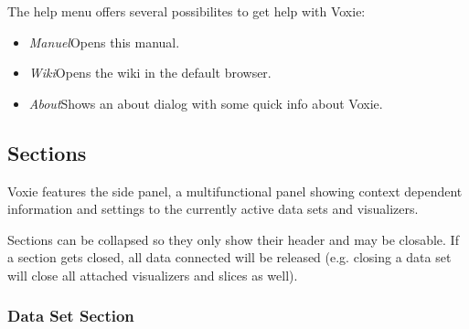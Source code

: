 The help menu offers several possibilites to get help with Voxie:

\begin{itemize}
	\item{\emph{Manuel}\newline Opens this manual.}
	\item{\emph{Wiki}\newline Opens the wiki in the default browser.}
	\item{\emph{About}\newline Shows an about dialog with some quick info about Voxie.}
\end{itemize}

\subsection{Sections}
\label{sections}

Voxie features the side panel, a multifunctional panel showing context dependent
information and settings to the currently active data sets and visualizers.

Sections can be collapsed so they only show their header and may be closable.
If a section gets closed, all data connected will be released (e.g. closing
a data set will close all attached visualizers and slices as well).


\subsubsection{Data Set Section}
